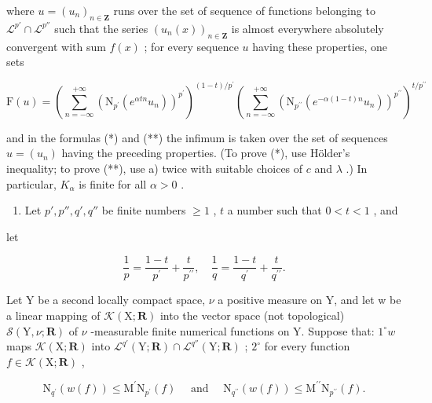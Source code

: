 where \(u = (u_n)_{n \in \mathbf{Z}}\) runs over the set of sequence of functions belonging to \(\mathcal{L}^{p'} \cap \mathcal{L}^{p''}\) such that the series \((u_n(x))_{n \in \mathbf{Z}}\) is almost everywhere absolutely convergent with sum \(f(x)\) ; for every sequence \(u\) having these properties, one sets

\[
\mathrm{F} (u) = \left(\sum_ {n = - \infty} ^ {+ \infty} \left(\mathrm{N} _ {p ^ {\prime}} (e ^ {\alpha t n} u _ {n})\right) ^ {p ^ {\prime}}\right) ^ {(1 - t) / p ^ {\prime}} \left(\sum_ {n = - \infty} ^ {+ \infty} \left(\mathrm{N} _ {p ^ {\prime \prime}} (e ^ {- \alpha (1 - t) n} u _ {n})\right) ^ {p ^ {\prime \prime}}\right) ^ {t / p ^ {\prime \prime}}
\]

and in the formulas (*) and (**) the infimum is taken over the set of sequences \(u = (u_n)\) having the preceding properties. (To prove (*), use Hölder's inequality; to prove (**), use a) twice with suitable choices of \(c\) and \(\lambda\) .) In particular, \(K_{\alpha}\) is finite for all \(\alpha > 0\) .

\begin{enumerate}
\def\labelenumi{\alph{enumi})}
\setcounter{enumi}{2}
\tightlist
\item
  Let \(p', p'', q', q''\) be finite numbers \(\geqslant 1\) , \(t\) a number such that \(0 < t < 1\) , and
\end{enumerate}

let

\[
{\frac {1}{p}} = {\frac {1 - t}{p ^ {\prime}}} + {\frac {t}{p ^ {\prime \prime}}}, \quad {\frac {1}{q}} = {\frac {1 - t}{q ^ {\prime}}} + {\frac {t}{q ^ {\prime \prime}}}.
\]

Let Y be a second locally compact space, \(\nu\) a positive measure on Y, and let w be a linear mapping of \(\mathcal{K}(\mathrm{X};\mathbf{R})\) into the vector space (not topological) \(\mathcal{S}(\mathrm{Y},\nu;\mathbf{R})\) of \(\nu\) -measurable finite numerical functions on Y. Suppose that: \(1^{\circ}w\) maps \(\mathcal{K}(\mathrm{X};\mathbf{R})\) into \(\mathcal{L}^{q'}(\mathrm{Y};\mathbf{R})\cap\mathcal{L}^{q''}(\mathrm{Y};\mathbf{R})\) ; \(2^{\circ}\) for every function \(f\in\mathcal{K}(\mathrm{X};\mathbf{R})\) ,

\[
\mathrm{N} _ {q ^ {\prime}} (w (f)) \leqslant \mathrm{M} ^ {\prime} \mathrm{N} _ {p ^ {\prime}} (f) \quad \text { and } \quad \mathrm{N} _ {q ^ {\prime \prime}} (w (f)) \leqslant \mathrm{M} ^ {\prime \prime} \mathrm{N} _ {p ^ {\prime \prime}} (f).
\]

